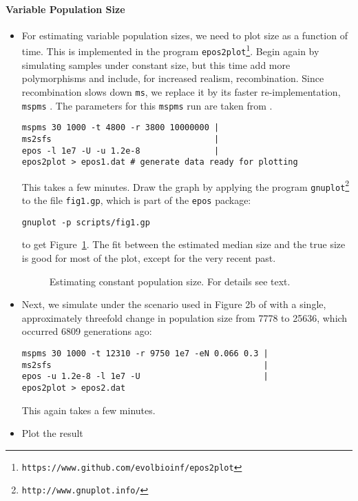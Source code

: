 \documentclass[a4paper, english]{article}
\newcommand{\ty}{\texttt}
\begin{document}
\paragraph{Variable Population Size}\label{sec:var}
\begin{itemize}
  \item For estimating variable population sizes, we need to
    plot size as a function of time. This is implemented in the
    program \ty{epos2plot}\footnote{\ty{https://www.github.com/evolbioinf/epos2plot}}. Begin again by simulating samples under constant 
    size, but this time add more polymorphisms and include, for
    increased realism, recombination. Since recombination slows down
    \ty{ms}, we replace it by its faster re-implementation, \ty{mspms}
    \citep{kel16:eff}. The parameters for this \ty{mspms} run are
    taken from \citep[Figure 2a]{liu15:exp}.
\begin{verbatim}
mspms 30 1000 -t 4800 -r 3800 10000000 |
ms2sfs                                 |
epos -l 1e7 -U -u 1.2e-8               |
epos2plot > epos1.dat # generate data ready for plotting
\end{verbatim}
This takes a few minutes. Draw the graph by applying the program
\ty{gnuplot}\footnote{\ty{http://www.gnuplot.info/}} to the file
\ty{fig1.gp}, which is part of the \ty{epos} package:
\begin{verbatim}
gnuplot -p scripts/fig1.gp
\end{verbatim}
to get Figure~\ref{fig:con}. The fit between the estimated median size
and the true size is good for most of the plot, except for the very
recent past.
\begin{figure}
  \begin{center}
    \scalebox{0.6}{}
  \end{center}
  \caption{Estimating constant population size. For details see
  text.}\label{fig:con}
\end{figure}
\item Next, we simulate under the scenario used in Figure 2b of \cite{liu15:exp}
  with a single, approximately threefold change in population size
  from 7778 to 25636, which occurred 6809 generations ago:
\begin{verbatim}
mspms 30 1000 -t 12310 -r 9750 1e7 -eN 0.066 0.3 |
ms2sfs                                           |
epos -u 1.2e-8 -l 1e7 -U                         |
epos2plot > epos2.dat
\end{verbatim}
This again takes a few minutes.
\item Plot the result

\end{itemize}
\end{document}
